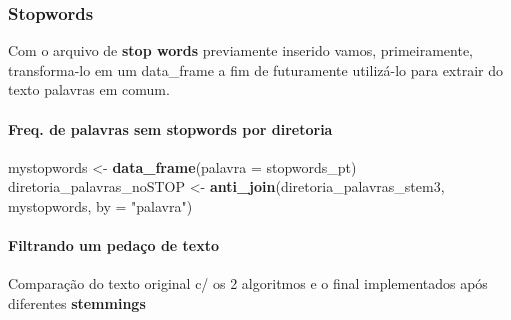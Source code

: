 \documentclass[]{article}
\newenvironment{Shaded}{\begin{snugshade}}{\end{snugshade}}
\newcommand{\DataTypeTok}[1]{\textcolor[rgb]{0.13,0.29,0.53}{#1}}
\newcommand{\DecValTok}[1]{\textcolor[rgb]{0.00,0.00,0.81}{#1}}
\newcommand{\KeywordTok}[1]{\textcolor[rgb]{0.13,0.29,0.53}{\textbf{#1}}}
\newcommand{\NormalTok}[1]{#1}
\newcommand{\OperatorTok}[1]{\textcolor[rgb]{0.81,0.36,0.00}{\textbf{#1}}}
\newcommand{\StringTok}[1]{\textcolor[rgb]{0.31,0.60,0.02}{#1}}
\let\oldparagraph\paragraph
\renewcommand{\paragraph}[1]{\oldparagraph{#1}\mbox{}}
\begin{document}
\hypertarget{stopwords-1}{%
\subsubsection{Stopwords}\label{stopwords-1}}

Com o arquivo de \textbf{stop words} previamente inserido vamos,
primeiramente, transforma-lo em um data\_frame a fim de futuramente
utilizá-lo para extrair do texto palavras em comum.

\hypertarget{freq.-de-palavras-sem-stopwords-por-diretoria}{%
\paragraph{\texorpdfstring{Freq. de palavras sem \textbf{stopwords} por
diretoria}{Freq. de palavras sem stopwords por diretoria}}\label{freq.-de-palavras-sem-stopwords-por-diretoria}}

\begin{Shaded}
\begin{Highlighting}[]
\NormalTok{mystopwords <-}\StringTok{ }\KeywordTok{data_frame}\NormalTok{(}\DataTypeTok{palavra =}\NormalTok{ stopwords_pt)}
\NormalTok{diretoria_palavras_noSTOP <-}\StringTok{ }\KeywordTok{anti_join}\NormalTok{(diretoria_palavras_stem3, mystopwords, }
                                       \DataTypeTok{by =} \StringTok{"palavra"}\NormalTok{)}
\end{Highlighting}
\end{Shaded}

\hypertarget{filtrando-um-pedaco-de-texto-1}{%
\paragraph{Filtrando um pedaço de
texto}\label{filtrando-um-pedaco-de-texto-1}}

\begin{Shaded}
\end{Shaded}

Comparação do texto original c/ os 2 algoritmos e o final implementados
após diferentes \textbf{stemmings}

\begin{Shaded}
\end{Shaded}
\end{document}
